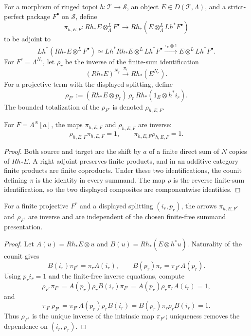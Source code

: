 \begin{definition}
\label{def:weil-pbc-projection-formula-arrows}
For a morphism of ringed topoi $h:\mathcal T\to\mathcal S$, an object
$E\in D(\mathcal T,\Lambda)$, and a strict-perfect package $F^\bullet$ on
$\mathcal S$, define
\[
 \pi_{h,E,F}:Rh_*E\otimes^L_\Lambda F^\bullet
 \longrightarrow Rh_*(E\otimes^L_\Lambda Lh^*F^\bullet)
\]
to be adjoint to
\[
 Lh^*(Rh_*E\otimes^LF^\bullet)
 \simeq Lh^*Rh_*E\otimes^LLh^*F^\bullet
 \xrightarrow{\epsilon_E\otimes1}
 E\otimes^LLh^*F^\bullet.
\]
For $F^r=\Lambda^{N_r}$, let $\rho_r$ be the inverse of the finite-sum
identification
\[
 (Rh_*E)^{N_r}\xrightarrow{\pi_r}Rh_*(E^{N_r}).
\]
For a projective term with the displayed splitting, define
\[
 \rho_{F^r}:=
 (Rh_*E\otimes p_r)\,\rho_r\,
 Rh_*(1_E\otimes h^*i_r).
\]
The bounded totalization of the $\rho_{F^r}$ is denoted
$\rho_{h,E,F}$.
\end{definition}

\begin{lemma}
\label{lemma:weil-pbc-projection-formula-finite-free}
For $F=\Lambda^N[a]$, the maps $\pi_{h,E,F}$ and $\rho_{h,E,F}$ are inverse:
\[
 \rho_{h,E,F}\pi_{h,E,F}=1,\qquad
 \pi_{h,E,F}\rho_{h,E,F}=1.
\]
\end{lemma}
\begin{proof}
Both source and target are the shift by $a$ of a finite direct sum of $N$
copies of $Rh_*E$.  A right adjoint preserves finite products, and in an
additive category finite products are finite coproducts.  Under these two
identifications, the counit defining $\pi$ is the identity in every summand.
The map $\rho$ is the reverse finite-sum identification, so the two displayed
composites are componentwise identities.
\end{proof}

\begin{lemma}
\label{lemma:weil-pbc-projection-formula-projective-summand}
For a finite projective $F^r$ and a displayed splitting $(i_r,p_r)$, the
arrows $\pi_{h,E,F^r}$ and $\rho_{F^r}$ are inverse and are independent of
the chosen finite-free summand presentation.
\end{lemma}
\begin{proof}

Let $A(u)=Rh_*E\otimes u$ and
$B(u)=Rh_*(E\otimes h^*u)$.  Naturality of the counit gives
\[
 B(i_r)\pi_{F^r}=\pi_rA(i_r),\qquad
 B(p_r)\pi_r=\pi_{F^r}A(p_r).
\]
Using $p_ri_r=1$ and the finite-free inverse equations, compute
\[
 \rho_{F^r}\pi_{F^r}
 =A(p_r)\rho_rB(i_r)\pi_{F^r}
 =A(p_r)\rho_r\pi_rA(i_r)=1,
\]
and
\[
 \pi_{F^r}\rho_{F^r}
 =\pi_{F^r}A(p_r)\rho_rB(i_r)
 =B(p_r)\pi_r\rho_rB(i_r)=1.
\]
Thus $\rho_{F^r}$ is the unique inverse of the intrinsic map $\pi_{F^r}$;
uniqueness removes the dependence on $(i_r,p_r)$.
\end{proof}

